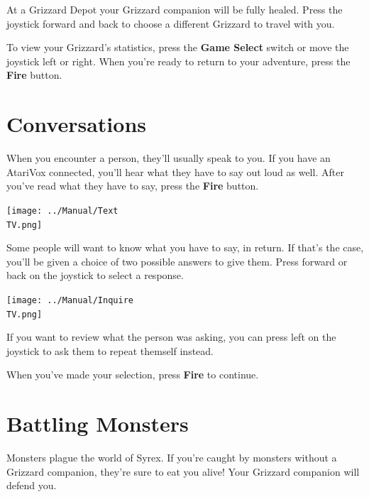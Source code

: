 \documentclass[10pt,twocolumn,openany,article]{memoir}
\newcommand\TV{NTSC}
\newcommand\TV{PAL}
\newcommand\TV{SECAM}
\begin{document}
At  a Grizzard  Depot  your  Grizzard companion  will  be fully  healed.
\ifdefined\NOSAVE\else  Press the  joystick forward  and back  to choose
a different Grizzard to travel with you. \fi

To  view  your Grizzard's  statistics,  press  the \textbf{Game  Select}
switch or move  the joystick left or right. When  you're ready to return
to your adventure, press the \textbf{Fire} button.

\section{Conversations}

When you encounter  a person, they'll usually speak to  you. If you have
an AtariVox  connected, you'll hear  what they have  to say out  loud as
well.   After  you've   read  what   they   have  to   say,  press   the
\textbf{Fire} button.

\begin{center}
  \texttt{[image: ../Manual/Text\\TV.png]}
\end{center}

Some people will want to know what you have to say, in return. If that's
the case, you'll be given a choice of two possible answers to give them.
Press forward or back on the joystick to select a response.

\begin{center}
  \texttt{[image: ../Manual/Inquire\\TV.png]}
\end{center}

If  you  want to  review  what  the person  was  asking,  you can  press
left on  the joystick to  ask them to repeat  themself instead.

When you've made your selection, press \textbf{Fire} to continue.

\section{Battling Monsters}

Monsters plague the world of Syrex. If you're caught by monsters without
a  Grizzard companion,  they're sure  to  eat you  alive! Your  Grizzard
companion will defend you.
\end{document}
